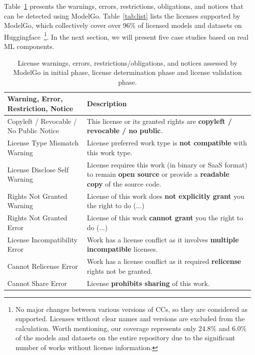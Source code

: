 Table~\ref{tab:analysis} presents the warnings, errors, restrictions, obligations, and notices that can be detected using ModelGo.
Table~\ref{tab:list} lists the licenses supported by ModelGo, which collectively cover over 96\% of licensed models and datasets on Huggingface~\footnote{No major changes between various versions of CCs, so they are considered as supported. Licenses without clear names and versions are excluded from the calculation. Worth mentioning, our coverage represents only 24.8\% and 6.0\% of the models and datasets on the entire repository due to the significant number of works without license information.}.
In the next section, we will present five case studies based on real ML components.


\begin{table}[t]
    \caption{License warnings, errors, restrictions/obligations, and notices assessed by ModelGo in \textcolor{Permissive}{initial phase}, \textcolor{Copyleft}{license determination phase} and license validation phase.}
    \vspace{-3mm}
    \scriptsize
    \label{tab:analysis}
    \begin{tabular}{|p{3.3cm}|p{4.3cm}|}

    \hline
    \rowcolor[gray]{.8}
    \textbf{Warning, Error, Restriction, Notice} & \textbf{Description} \\ \hline
    
    \textcolor{Permissive}{Copyleft / Revocable / No Public Notice} & This license or its granted rights are \textbf{copyleft / revocable / no public}. \\ \hline \hline
    
    \textcolor{Permissive}{License Type Mismatch Warning} & License preferred work type is \textbf{not compatible} with this work type. \\ \hline
    License Disclose Self Warning & License requires this work (in binary or SaaS format) to remain \textbf{open source} or provide a \textbf{readable copy} of the source code. \\ \hline
    Rights Not Granted Warning & License of this work does \textbf{not explicitly grant} you the right to do (...) \\ \hline \hline
    
    
    Rights Not Granted Error & License of this work \textbf{cannot grant} you the right to do (...) \\ \hline
    \textcolor{Copyleft}{License Incompatibility Error} & Work has a license conflict as it involves \textbf{multiple incompatible} licenses. \\ \hline
    \textcolor{Copyleft}{Cannot Relicense Error} & Work has a license conflict as it required \textbf{relicense} rights not be granted. \\ \hline
    Cannot Share Error & License \textbf{prohibits sharing} of this work. \\ \hline \hline


\end{tabular}
\end{table}
